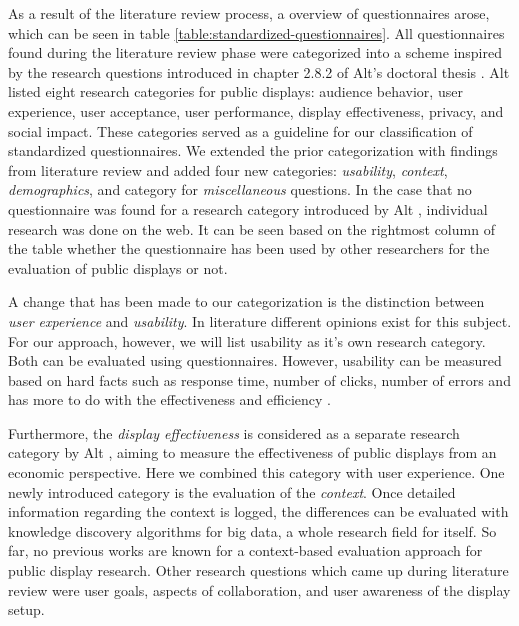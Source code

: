 
	As a result of the literature review process, a overview of questionnaires arose, which can be seen in table \ref{table:standardized-questionnaires}. All questionnaires found during the literature review phase were categorized into a scheme inspired by the research questions introduced in chapter 2.8.2 of Alt's doctoral thesis \cite{alt2013thesis}. Alt listed eight research categories for public displays: audience behavior, user experience, user acceptance, user performance, display effectiveness, privacy, and social impact. These categories served as a guideline for our classification of standardized questionnaires. We extended the prior categorization with findings from literature review and added four new categories: \textit{usability}, \textit{context}, \textit{demographics}, and category for \textit{miscellaneous} questions. In the case that no questionnaire was found for a research category introduced by Alt \cite{alt2013thesis}, individual research was done on the web. It can be seen based on the rightmost column of the table whether the questionnaire has been used by other researchers for the evaluation of public displays or not.

	A change that has been made to our categorization is the distinction between \textit{user experience} and \textit{usability}. In literature different opinions exist for this subject. For our approach, however, we will list usability as it's own research category. Both can be evaluated using questionnaires. However, usability can be measured based on hard facts such as response time, number of clicks, number of errors and has more to do with the effectiveness and efficiency \cite{bevan2009difference}.

	Furthermore, the \textit{display effectiveness} is considered as a separate research category by Alt \cite{alt2013thesis}, aiming to measure the effectiveness of public displays from an economic perspective. Here we combined this category with user experience.
	One newly introduced category is the evaluation of the \textit{context}. Once detailed information regarding the context is logged, the differences can be evaluated with knowledge discovery algorithms for big data, a whole research field for itself. So far, no previous works are known for a context-based evaluation approach for public display research.
	Other research questions which came up during literature review were user goals, aspects of collaboration, and user awareness of the display setup.


